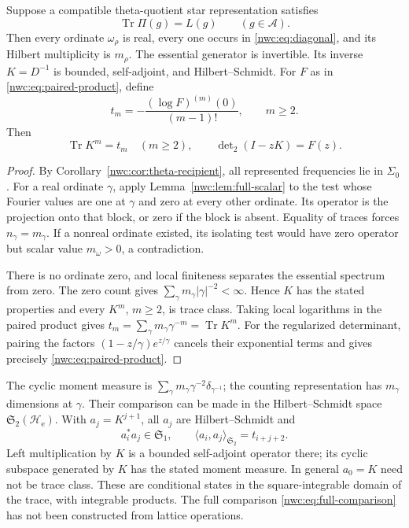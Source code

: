 \begin{theorem}
\label{nwc:thm:conditional}
Suppose a compatible theta-quotient star representation satisfies
\begin{equation}\label{nwc:eq:full-comparison}
 \operatorname{Tr}\Pi(g)=L(g)\qquad(g\in\mathcal A).
\end{equation}
Then every ordinate $\omega_\rho$ is real, every one occurs in
\eqref{nwc:eq:diagonal}, and its Hilbert multiplicity is $m_\rho$.
The essential generator is invertible. Its inverse $K=D^{-1}$ is
bounded, self-adjoint, and Hilbert--Schmidt.
For $F$ as in \eqref{nwc:eq:paired-product}, define
\[
 t_m=-\frac{(\log F)^{(m)}(0)}{(m-1)!},\qquad m\geq2.
\]
Then
\begin{equation}\label{nwc:eq:all-moments}
 \operatorname{Tr}K^m=t_m\quad(m\geq2),\qquad
 \det\nolimits_2(I-zK)=F(z).
\end{equation}
\end{theorem}
\begin{proof}
By Corollary~\ref{nwc:cor:theta-recipient}, all represented
frequencies lie in $\Sigma_0$.
For a real ordinate $\gamma$, apply
Lemma~\ref{nwc:lem:full-scalar} to the test whose Fourier values
are one at $\gamma$ and zero at every other ordinate.
Its operator is the projection onto that block, or zero if the
block is absent. Equality of traces forces $n_\gamma=m_\gamma$.
If a nonreal ordinate existed, its isolating test would have zero
operator but scalar value $m_\omega>0$, a contradiction.

There is no ordinate zero, and local finiteness separates the
essential spectrum from zero. The zero count gives
$\sum_\gamma m_\gamma|\gamma|^{-2}<\infty$.
Hence $K$ has the stated properties and every $K^m$, $m\geq2$,
is trace class. Taking local logarithms in the paired product gives
$t_m=\sum_\gamma m_\gamma\gamma^{-m}=\operatorname{Tr}K^m$.
For the regularized determinant, pairing the factors
$(1-z/\gamma)e^{z/\gamma}$ cancels their exponential terms and
gives precisely \eqref{nwc:eq:paired-product}.
\end{proof}

The cyclic moment measure is
$\sum_\gamma m_\gamma\gamma^{-2}\delta_{\gamma^{-1}}$;
the counting representation has $m_\gamma$ dimensions at $\gamma$.
Their comparison can be made in the Hilbert--Schmidt space
$\mathfrak S_2(\mathcal H_{\mathrm e})$.
With $a_j=K^{j+1}$, all $a_j$ are Hilbert--Schmidt and
\[
 a_i^*a_j\in\mathfrak S_1,
 \qquad \langle a_i,a_j\rangle_{\mathfrak S_2}=t_{i+j+2}.
\]
Left multiplication by $K$ is a bounded self-adjoint operator there;
its cyclic subspace generated by $K$ has the stated moment measure.
In general $a_0=K$ need not be trace class. These are conditional
states in the square-integrable domain of the trace, with integrable
products. The full comparison \eqref{nwc:eq:full-comparison} has not
been constructed from lattice operations.

